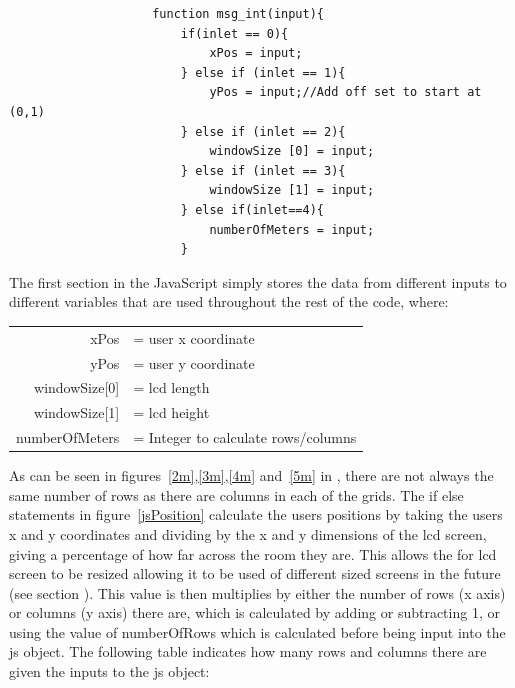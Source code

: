 \documentclass[../../main.tex]{subfiles}
\begin{document}
				\begin{minipage}{0.6\textwidth}
					\begin{lstlisting}
					function msg_int(input){
						if(inlet == 0){
							xPos = input; 
						} else if (inlet == 1){
							yPos = input;//Add off set to start at (0,1)
						} else if (inlet == 2){
							windowSize [0] = input;
						} else if (inlet == 3){
							windowSize [1] = input;
						} else if(inlet==4){
							numberOfMeters = input;
						}
					\end{lstlisting}
				\end{minipage}
				\begin{minipage}{0.4\textwidth}
					The first section in the JavaScript simply stores the data from different inputs to different variables that are used throughout the rest of the code, where:

					\vspace{5mm}

					\hspace{-10mm}\begin{tabular}{r l}
						xPos & = user x coordinate \\
						yPos & = user y coordinate \\
						windowSize[0] & = lcd length \\
						windowSize[1] & = lcd height \\
						numberOfMeters & = Integer to calculate rows/columns \\
					\end{tabular}
					
				\end{minipage}

				As can be seen in figures~\ref{2m},\ref{3m},\ref{4m} and~\ref{5m} in , there are not always the same number of rows as there are columns in each of the grids. The if else statements in figure~\ref{jsPosition} calculate the users positions by taking the users x and y coordinates and dividing by the x and y dimensions of the lcd screen, giving a percentage of how far across the room they are. This allows the for lcd screen to be resized allowing it to be used of different sized screens in the future (see section ). This value is then multiplies by either the number of rows (x axis) or columns (y axis) there are, which is calculated by adding or subtracting 1, or using the value of numberOfRows which is calculated before being input into the js object. The following table indicates how many rows and columns there are given the inputs to the js object:
\end{document}
